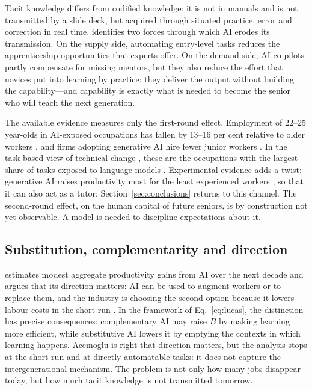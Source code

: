 \documentclass[preprint,12pt,authoryear]{elsarticle}
\begin{document}
Tacit knowledge differs from codified knowledge: it is not in manuals and is not transmitted by a slide deck, but acquired through situated practice, error and correction in real time. \citet{Ide2026} identifies two forces through which AI erodes its transmission. On the supply side, automating entry-level tasks reduces the apprenticeship opportunities that experts offer. On the demand side, AI co-pilots partly compensate for missing mentors, but they also reduce the effort that novices put into learning by practice: they deliver the output without building the capability---and capability is exactly what is needed to become the senior who will teach the next generation.

The available evidence measures only the first-round effect. Employment of 22--25 year-olds in AI-exposed occupations has fallen by 13--16 per cent relative to older workers \citep{Brynjolfsson2025}, and firms adopting generative AI hire fewer junior workers \citep{HosseiniLichtinger2025}. In the task-based view of technical change \citep{AutorLevyMurnane2003,AcemogluAutor2011}, these are the occupations with the largest share of tasks exposed to language models \citep{Eloundou2024}. Experimental evidence adds a twist: generative AI raises productivity most for the least experienced workers \citep{NoyZhang2023,DellAcqua2023,BrynjolfssonLiRaymond2025}, so that it can also act as a tutor; Section~\ref{sec:conclusions} returns to this channel. The second-round effect, on the human capital of future seniors, is by construction not yet observable. A model is needed to discipline expectations about it.

\subsection{Substitution, complementarity and direction}

\citet{Acemoglu2024} estimates modest aggregate productivity gains from AI over the next decade and argues that its direction matters: AI can be used to augment workers or to replace them, and the industry is choosing the second option because it lowers labour costs in the short run \citep[see also][]{AcemogluRestrepo2019}. In the framework of Eq.~\eqref{eq:lucas}, the distinction has precise consequences: complementary AI may raise $B$ by making learning more efficient, while substitutive AI lowers it by emptying the contexts in which learning happens. Acemoglu is right that direction matters, but the analysis stops at the short run and at directly automatable tasks: it does not capture the intergenerational mechanism. The problem is not only how many jobs disappear today, but how much tacit knowledge is not transmitted tomorrow.
\end{document}
